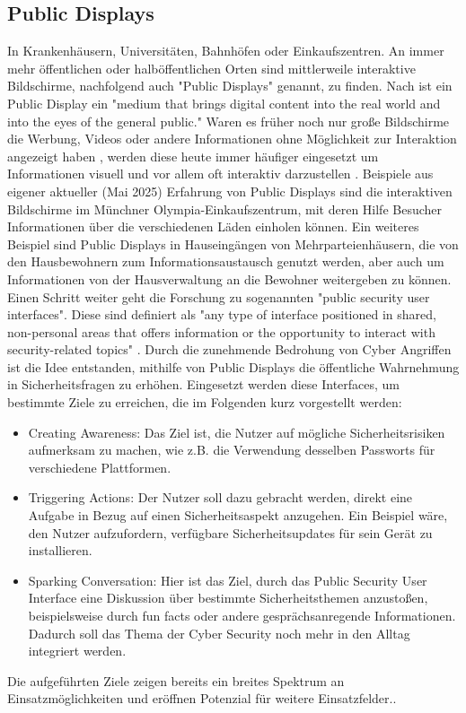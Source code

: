\subsection{Public Displays}
In Krankenhäusern, Universitäten, Bahnhöfen oder Einkaufszentren. 
An immer mehr öffentlichen oder halböffentlichen Orten sind mittlerweile interaktive Bildschirme, 
nachfolgend auch "Public Displays" genannt, zu finden. Nach \textcite{parkerDoesPublicStill2018} ist ein Public Display 
ein "medium that brings digital content into the real world and into the eyes of the general public." \cite[S.1]{parkerDoesPublicStill2018} 
Waren es früher noch nur große Bildschirme die Werbung, Videos oder andere Informationen ohne Möglichkeit zur Interaktion angezeigt haben \cite{PDFEnticingPeople}, 
werden diese heute immer häufiger eingesetzt um Informationen visuell und vor allem oft interaktiv darzustellen \cite{hinrichsInteractivePublicDisplays2013}. 
Beispiele aus eigener aktueller (Mai 2025) Erfahrung von Public Displays sind die interaktiven Bildschirme im Münchner Olympia-Einkaufszentrum, 
mit deren Hilfe Besucher Informationen über die verschiedenen Läden einholen können. 
Ein weiteres Beispiel sind Public Displays in Hauseingängen von Mehrparteienhäusern, 
die von den Hausbewohnern zum Informationsaustausch genutzt werden, aber auch um Informationen von der Hausverwaltung an die Bewohner weitergeben zu können.
Einen Schritt weiter geht die Forschung zu sogenannten "public security user interfaces". 
Diese sind definiert als "any type of interface positioned in shared, 
non-personal areas that offers information or the opportunity to interact with security-related topics" \cite[S.57]{murtezajPublicSecurityUser2025}. 
Durch die zunehmende Bedrohung von Cyber Angriffen ist die Idee entstanden, mithilfe von Public Displays die öffentliche Wahrnehmung in Sicherheitsfragen zu erhöhen. 
Eingesetzt werden diese Interfaces, um bestimmte Ziele zu erreichen, die im Folgenden kurz vorgestellt werden:
\begin{itemize}
    \item Creating Awareness: Das Ziel ist, die Nutzer auf mögliche Sicherheitsrisiken aufmerksam zu machen, wie z.B. die Verwendung desselben Passworts für verschiedene Plattformen.
    \item Triggering Actions: Der Nutzer soll dazu gebracht werden, direkt eine Aufgabe in Bezug auf einen Sicherheitsaspekt anzugehen. 
        Ein Beispiel wäre, den Nutzer aufzufordern, verfügbare Sicherheitsupdates für sein Gerät zu installieren.
    \item Sparking Conversation: Hier ist das Ziel, durch das Public Security User Interface eine Diskussion über bestimmte Sicherheitsthemen anzustoßen, 
        beispielsweise durch fun facts oder andere gesprächsanregende Informationen. 
        Dadurch soll das Thema der Cyber Security noch mehr in den Alltag integriert werden.
\end{itemize}
Die aufgeführten Ziele zeigen bereits ein breites Spektrum an Einsatzmöglichkeiten und eröffnen Potenzial für weitere Einsatzfelder.\cite{murtezajPublicSecurityUser2025}.

